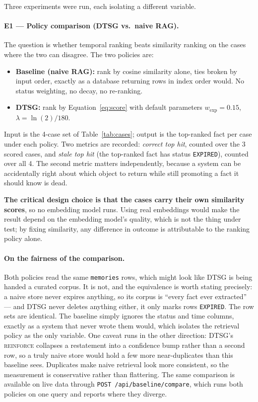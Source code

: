 \documentclass[11pt,a4paper]{article}
\begin{document}
Three experiments were run, each isolating a different variable.

\paragraph{E1 --- Policy comparison (DTSG vs.\ naive RAG).} The question is
whether temporal ranking beats similarity ranking on the cases where the two can
disagree. The two policies are:
\begin{itemize}
  \item \textbf{Baseline (naive RAG):} rank by cosine similarity alone, ties
        broken by input order, exactly as a database returning rows in index
        order would. No status weighting, no decay, no re-ranking.
  \item \textbf{DTSG:} rank by Equation~\eqref{eq:score} with default
        parameters $w_{\text{exp}} = 0.15$, $\lambda = \ln(2)/180$.
\end{itemize}
Input is the 4-case set of Table~\ref{tab:cases}; output is the top-ranked fact
per case under each policy. Two metrics are recorded: \emph{correct top hit},
counted over the 3 scored cases, and \emph{stale top hit} (the top-ranked fact
has status \texttt{EXPIRED}), counted over all 4. The second metric matters
independently, because a system can be accidentally right about which object to
return while still promoting a fact it should know is dead.

\textbf{The critical design choice is that the cases carry their own similarity
scores}, so no embedding model runs. Using real embeddings would make the result
depend on the embedding model's quality, which is not the thing under test; by
fixing similarity, any difference in outcome is attributable to the ranking
policy alone.

\paragraph{On the fairness of the comparison.} Both policies read the same
\texttt{memories} rows, which might look like DTSG is being handed a curated
corpus. It is not, and the equivalence is worth stating precisely: a naive store
never expires anything, so its corpus is ``every fact ever extracted'' --- and
DTSG never deletes anything either, it only marks rows \texttt{EXPIRED}. The row
sets are identical. The baseline simply ignores the status and time columns,
exactly as a system that never wrote them would, which isolates the retrieval
policy as the only variable. One caveat runs in the other direction:
DTSG's \textsc{reinforce} collapses a restatement into a confidence bump rather
than a second row, so a truly naive store would hold a few more near-duplicates
than this baseline sees. Duplicates make naive retrieval look more consistent,
so the measurement is conservative rather than flattering. The same comparison
is available on live data through \texttt{POST /api/baseline/compare}, which
runs both policies on one query and reports where they diverge.
\end{document}

